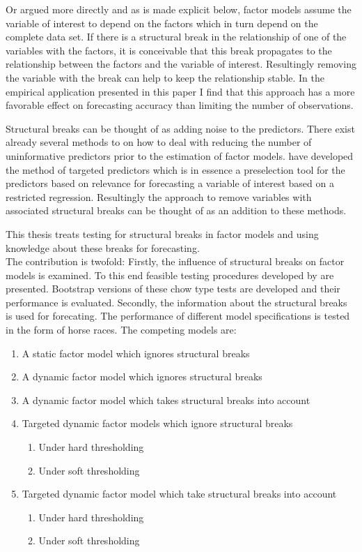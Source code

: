 \documentclass[12pt]{article}
\begin{document}
Or argued more directly and as is made explicit below, factor models assume the variable of interest to depend on the factors which in turn depend on the complete data set. If there is a structural break in the relationship of one of the variables with the factors, it is conceivable that this break propagates to the relationship between the factors and the variable of interest. Resultingly removing the variable with the break can help to keep the relationship stable. In the empirical application presented in this paper I find that this approach has a more favorable effect on forecasting accuracy than limiting the number of observations.

Structural breaks can be thought of as adding noise to the predictors. There exist already several methods to on how to deal with reducing the number of uninformative predictors prior to the estimation of factor models. \citet{bai2008forecasting} have developed the method of targeted predictors which is in essence a preselection tool for the predictors based on relevance for forecasting a variable of interest based on a restricted regression. Resultingly the approach to remove variables with associated structural breaks can be thought of as an addition to these methods.

This thesis treats testing for structural breaks in factor models and using knowledge about these breaks for forecasting. \\
The contribution is twofold: Firstly, the influence of structural breaks on factor models is examined. To this end feasible testing procedures developed by \citet{breitung2011testing} are presented. Bootstrap versions of these chow type tests are developed and their performance is evaluated. Secondly, the information about the structural breaks is used for forecating. The performance of different model specifications is tested in the form of horse races. The competing models are:

\begin{enumerate}
	\item A static factor model which ignores structural breaks
	\item A dynamic factor model which ignores structural breaks
	\item A dynamic factor model which takes structural breaks into account
	\item Targeted dynamic factor models which ignore structural breaks
		\begin{enumerate}
			\item Under hard thresholding
			\item Under soft thresholding
		\end{enumerate}
	\item Targeted dynamic factor model which take structural breaks into account
		\begin{enumerate}
			\item Under hard thresholding
			\item Under soft thresholding
		\end{enumerate}
\end{enumerate}
\end{document}
